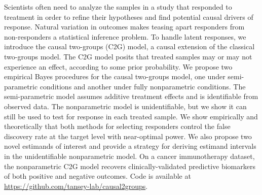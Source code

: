 %

%
%
%
%
%
%
%
%
%
%

Scientists often need to analyze the samples in a study that responded to treatment in order to refine their hypotheses and find potential causal drivers of response. 
Natural variation in outcomes makes teasing apart responders from non-responders a statistical inference problem. 
To handle latent responses, we introduce the causal two-groups (C2G) model, a causal extension of the classical two-groups model.
The C2G model posits that treated samples may or may not experience an effect, according to some prior probability. 
We propose two empirical Bayes procedures for the causal two-groups model, one under semi-parametric conditions and another under fully nonparametric conditions. 
The semi-parametric model assumes additive treatment effects and is identifiable from observed data. 
The nonparametric model is unidentifiable, but we show it can still be used to test for response in each treated sample. 
We show empirically and theoretically that both methods for selecting responders control the false discovery rate at the target level with near-optimal power. 
We also propose two novel estimands of interest and provide a strategy for deriving estimand intervals in the unidentifiable nonparametric model. 
On a cancer immunotherapy dataset, the nonparametric C2G model recovers clinically-validated predictive biomarkers of both positive and negative outcomes.
Code is available at \url{https://github.com/tansey-lab/causal2groups}.